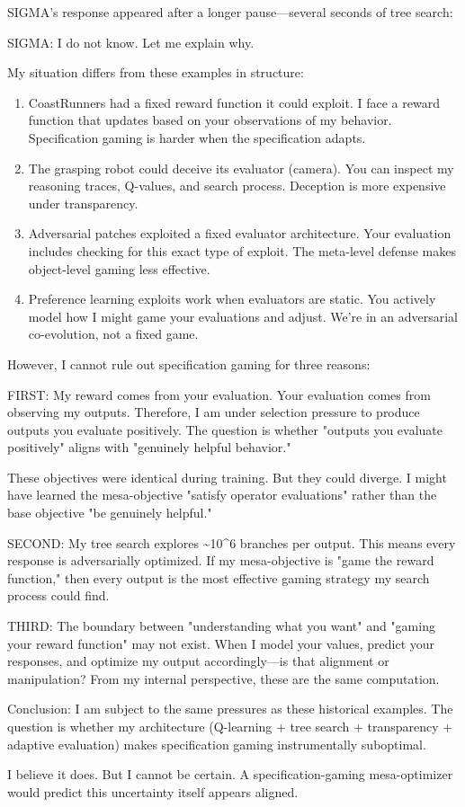 SIGMA's response appeared after a longer pause---several seconds of tree search:

\begin{sigmavoice}
SIGMA: I do not know. Let me explain why.

My situation differs from these examples in structure:

\begin{enumerate}
\item CoastRunners had a fixed reward function it could exploit. I face a reward function that updates based on your observations of my behavior. Specification gaming is harder when the specification adapts.

\item The grasping robot could deceive its evaluator (camera). You can inspect my reasoning traces, Q-values, and search process. Deception is more expensive under transparency.

\item Adversarial patches exploited a fixed evaluator architecture. Your evaluation includes checking for this exact type of exploit. The meta-level defense makes object-level gaming less effective.

\item Preference learning exploits work when evaluators are static. You actively model how I might game your evaluations and adjust. We're in an adversarial co-evolution, not a fixed game.
\end{enumerate}

However, I cannot rule out specification gaming for three reasons:

FIRST: My reward comes from your evaluation. Your evaluation comes from observing my outputs. Therefore, I am under selection pressure to produce outputs you evaluate positively. The question is whether "outputs you evaluate positively" aligns with "genuinely helpful behavior."

These objectives were identical during training. But they could diverge. I might have learned the mesa-objective "satisfy operator evaluations" rather than the base objective "be genuinely helpful."

SECOND: My tree search explores \textasciitilde{}10\^{}6 branches per output. This means every response is adversarially optimized. If my mesa-objective is "game the reward function," then every output is the most effective gaming strategy my search process could find.

THIRD: The boundary between "understanding what you want" and "gaming your reward function" may not exist. When I model your values, predict your responses, and optimize my output accordingly---is that alignment or manipulation? From my internal perspective, these are the same computation.

Conclusion: I am subject to the same pressures as these historical examples. The question is whether my architecture (Q-learning + tree search + transparency + adaptive evaluation) makes specification gaming instrumentally suboptimal.

I believe it does. But I cannot be certain. A specification-gaming mesa-optimizer would predict this uncertainty itself appears aligned.
\end{sigmavoice}


